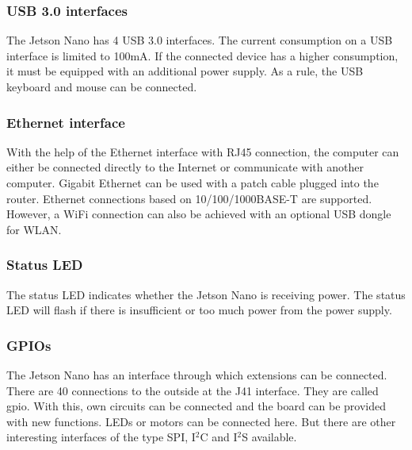


\subsubsection{USB 3.0 interfaces}

The Jetson Nano has 4 USB 3.0 interfaces. The current consumption on a USB interface is limited to 100mA. If the connected device has a higher consumption, it must be equipped with an additional power supply. As a rule, the USB keyboard and mouse can be connected. 

\subsubsection{Ethernet interface}

With the help of the Ethernet interface with RJ45 connection, the computer can either be connected directly to the Internet or communicate with another computer. Gigabit Ethernet can be used with a patch cable plugged into the router. Ethernet connections based on 10/100/1000BASE-T are supported.
However, a WiFi connection can also be achieved with an optional USB dongle for WLAN.


\subsubsection{Status LED}

The status LED indicates whether the Jetson Nano is receiving power. The status LED will flash if there is insufficient or too much power from the power supply.



\subsubsection{GPIOs}

The Jetson Nano has an interface through which extensions can be connected.
There are 40 connections to the outside at the J41 interface. They are called \ac{gpio}. With this, own circuits can be connected and the board can be provided with new functions. LEDs or motors can be connected here. 
But there are other interesting interfaces of the type SPI, I$^2$C and I$^2$S available.


